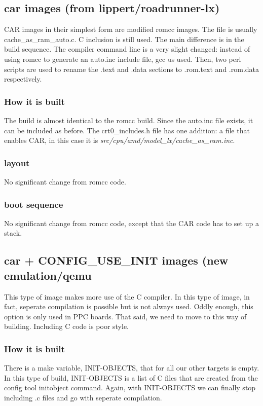 \documentclass[titlepage,12pt]{article}
\begin{document}
\subsection{car images (from lippert/roadrunner-lx)}
CAR images in their simplest form are modified romcc images. The file is usually cache\_as\_ram\_auto.c. C inclusion is still used. The main difference is in the build sequence. The compiler command line is a very slight changed: instead of using romcc to generate an auto.inc include file, gcc us used. Then, two perl scripts are used to rename the .text and .data sections to .rom.text and .rom.data respectively. 
\subsubsection{How it is built}
The build is almost identical to the romcc build. Since the auto.inc file exists, it can be included as before. The crt0\_includes.h file has one addition: a file that enables CAR, in this case it is \textit{src/cpu/amd/model\_lx/cache\_as\_ram.inc}. 
\subsubsection{layout}
No significant change from romcc code. 
\subsubsection{boot sequence}
No significant change from romcc code, except that the CAR code has to set up a stack. 

\subsection{car + CONFIG\_USE\_INIT images (new emulation/qemu}
This type of image makes more use of the C compiler. In this type of image, in fact, 
seperate compilation is possible but is not always used. Oddly enough, this option is only used in PPC boards. That said, we need to move to this way of building. Including C code is poor style. 
\subsubsection{How it is built}
There is a make variable, INIT-OBJECTS, that for all our other targets is empty. In this type of build, INIT-OBJECTS is a list of C files that are created from the config tool initobject command. Again, with INIT-OBJECTS we can finally stop including .c files and go with seperate compilation.
\end{document}
